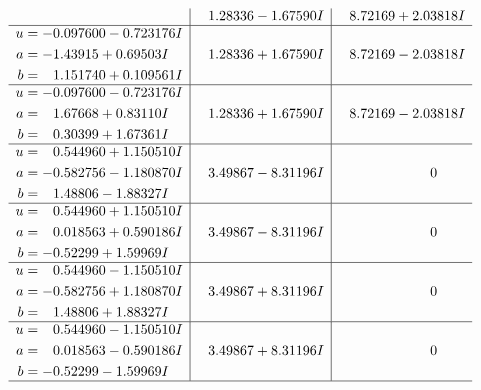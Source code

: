 \documentclass[1p]{elsarticle_modified}
\theoremstyle{definition}
\begin{document}
$$\begin{array}{c|c|c}
 & \phantom{-}1.28336 - 1.67590 I & \phantom{-}8.72169 + 2.03818 I \\ \hline\begin{aligned}
u &= -0.097600 - 0.723176 I \\
a &= -1.43915 + 0.69503 I \\
b &= \phantom{-}1.151740 + 0.109561 I\end{aligned}
 & \phantom{-}1.28336 + 1.67590 I & \phantom{-}8.72169 - 2.03818 I \\ \hline\begin{aligned}
u &= -0.097600 - 0.723176 I \\
a &= \phantom{-}1.67668 + 0.83110 I \\
b &= \phantom{-}0.30399 + 1.67361 I\end{aligned}
 & \phantom{-}1.28336 + 1.67590 I & \phantom{-}8.72169 - 2.03818 I \\ \hline\begin{aligned}
u &= \phantom{-}0.544960 + 1.150510 I \\
a &= -0.582756 - 1.180870 I \\
b &= \phantom{-}1.48806 - 1.88327 I\end{aligned}
 & \phantom{-}3.49867 - 8.31196 I & \phantom{-0.000000 } 0 \\ \hline\begin{aligned}
u &= \phantom{-}0.544960 + 1.150510 I \\
a &= \phantom{-}0.018563 + 0.590186 I \\
b &= -0.52299 + 1.59969 I\end{aligned}
 & \phantom{-}3.49867 - 8.31196 I & \phantom{-0.000000 } 0 \\ \hline\begin{aligned}
u &= \phantom{-}0.544960 - 1.150510 I \\
a &= -0.582756 + 1.180870 I \\
b &= \phantom{-}1.48806 + 1.88327 I\end{aligned}
 & \phantom{-}3.49867 + 8.31196 I & \phantom{-0.000000 } 0 \\ \hline\begin{aligned}
u &= \phantom{-}0.544960 - 1.150510 I \\
a &= \phantom{-}0.018563 - 0.590186 I \\
b &= -0.52299 - 1.59969 I\end{aligned}
 & \phantom{-}3.49867 + 8.31196 I & \phantom{-0.000000 } 0\\
 \hline 
 \end{array}$$\newpage$$\begin{array}{c|c|c}  

\end{array}$$
\end{document}
